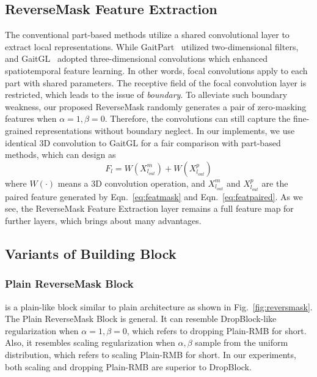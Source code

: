 \documentclass[runningheads]{llncs}
\begin{document}
\subsection{ReverseMask Feature Extraction}
\label{subsection:fe}

The conventional part-based methods utilize a shared convolutional layer to extract local representations. While GaitPart~\cite{gaitpart} utilized two-dimensional filters, and GaitGL~\cite{gaitgl} adopted three-dimensional convolutions which enhanced spatiotemporal feature learning. In other words, focal convolutions apply to each part with shared parameters. The receptive field of the focal convolution layer is restricted, which leads to the issue of \textit{boundary}. To alleviate such boundary weakness, our proposed ReverseMask randomly generates a pair of zero-masking features when $\alpha=1,\beta=0$. Therefore, the convolutions can still capture the fine-grained representations without boundary neglect. In our implements, we use identical 3D convolution to GaitGL\cite{gaitgl} for a fair comparison with part-based methods, which can design as
    \begin{equation}
     \mathit{F_{l}} = W(X^{m}_{l_{out}}) + W(X^{p}_{l_{out}})
    \end{equation}
    where $W(\cdot)$ means a 3D convolution operation, and $X^{m}_{l_{out}}$ and $X^{p}_{l_{out}}$ are the paired feature generated by Eqn.~\ref{eq:featmask} and Eqn.~\ref{eq:featpaired}. As we see, the ReverseMask Feature Extraction layer remains a full feature map for further layers, which brings about many advantages. 




\subsection{Variants of Building Block}
\label{subsection:block}

\subsubsection{Plain ReverseMask Block} is a plain-like block similar to plain architecture as shown in Fig.~\ref{fig:reversmask}. The Plain ReverseMask Block is general. It can resemble DropBlock-like regularization when $\alpha=1, \beta=0$, which refers to dropping Plain-RMB for short. Also, it resembles scaling regularization when $\alpha,\beta$ sample from the uniform distribution,  which refers to scaling Plain-RMB for short. In our experiments, both scaling and dropping Plain-RMB are superior to DropBlock.   
\end{document}
